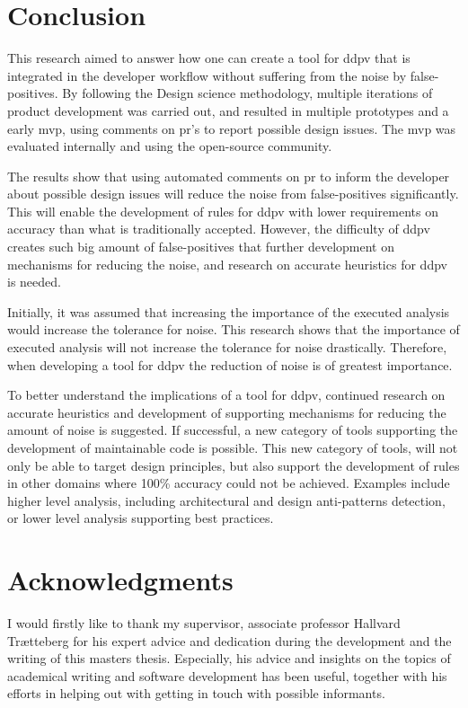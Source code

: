 \documentclass[pdftex,10pt,b5paper,twoside]{report}
\begin{document}
\section{Conclusion}
\label{conclusion}


This research aimed to answer how one can create a tool for \gls{ddpv} that is integrated in the developer workflow without suffering from the noise by false-positives. By following the Design science methodology, multiple iterations of product development was carried out, and resulted in multiple prototypes and a early \gls{mvp}, using comments on \gls{pr}'s to report possible design issues. The \gls{mvp} was evaluated internally and using the open-source community. 


The results show that using automated comments on \gls{pr} to inform the developer about possible design issues will reduce the noise from false-positives significantly. This will enable the development of rules for \gls{ddpv} with lower requirements on accuracy than what is traditionally accepted. However, the difficulty of \gls{ddpv} creates such big amount of false-positives that further development on mechanisms for reducing the noise, and research on accurate heuristics for \gls{ddpv} is needed.

Initially, it was assumed that increasing the importance of the executed analysis would increase the tolerance for noise. This research shows that the importance of executed analysis will not increase the tolerance for noise drastically. Therefore, when developing a tool for \gls{ddpv} the reduction of noise is of greatest importance. 

To better understand the implications of a tool for \gls{ddpv}, continued research on accurate heuristics and development of supporting mechanisms for reducing the amount of noise is suggested. If successful, a new category of tools supporting the development of maintainable code is possible. This new category of tools, will not only be able to target design principles, but also support the development of rules in other domains where 100\% accuracy could not be achieved. Examples include higher level analysis, including architectural and design anti-patterns detection, or lower level analysis supporting best practices.

\section{Acknowledgments}
\label{acknowledgements}
I would firstly like to thank my supervisor, associate professor Hallvard Trætteberg for his expert advice and dedication during the development and the writing of this masters thesis. Especially, his advice and insights on the topics of academical writing and software development has been useful, together with his efforts in helping out with getting in touch with possible informants.
\end{document}
